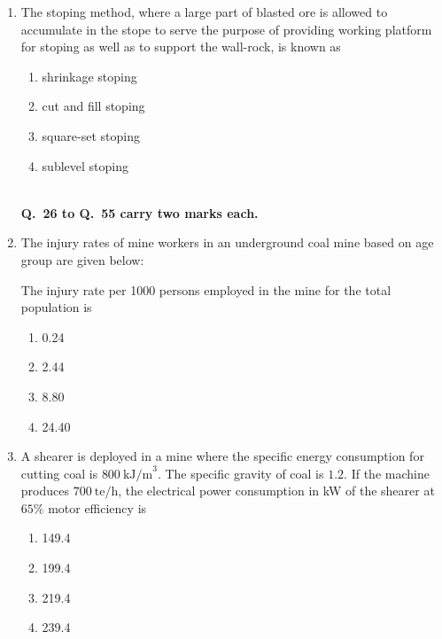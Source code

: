 \documentclass[journal]{IEEEtran}
\begin{document}
\begin{enumerate}[leftmargin=0pt]
\item The stoping method, where a large part of blasted ore is allowed to accumulate in the stope to
serve the purpose of providing working platform for stoping as well as to support the wall-rock,
is known as
\begin{multicols}{2}
\begin{enumerate}[label=(\Alph*), itemsep=0pt, topsep=2pt]
  \item shrinkage stoping
  \item cut and fill stoping
  \item square-set stoping
  \item sublevel stoping
\end{enumerate}
\end{multicols}
\hfill{}\\[0.5em]
\vspace{0.3cm}
\noindent\textbf{Q.~26 to Q.~55 carry two marks each.}
\vspace{0.3cm}


\item The injury rates of mine workers in an underground coal mine based on age group are given below:



The injury rate per 1000 persons employed in the mine for the total population is

\begin{multicols}{2}
\begin{enumerate}[label=(\Alph*)]
\item 0.24
\item 2.44
\item 8.80
\item 24.40
\end{enumerate}
\end{multicols}
\hfill{}

\item A shearer is deployed in a mine where the specific energy consumption for cutting coal is $800~\text{kJ/m}^3$. 
The specific gravity of coal is $1.2$. If the machine produces $700~\text{te/h}$, the electrical power consumption in kW of the shearer at $65\%$ motor efficiency is
\begin{multicols}{2}
\begin{enumerate}[label=(\Alph*),itemsep=0pt,topsep=2pt]
  \item 149.4
  \item 199.4
  \item 219.4
  \item 239.4
\end{enumerate}
\end{multicols}
\hfill{}


\end{enumerate}
\end{document}
